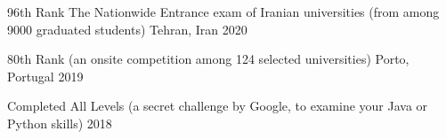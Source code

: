 

\begin{cvhonors}

  \cvhonor
    {96th Rank} %
    {The Nationwide Entrance exam of Iranian universities (from among 9000 graduated students)} %
    {Tehran, Iran} %
    {2020} %

  \cvhonor
    {80th Rank} %
    { (an onsite competition among 124 selected universities)} %
    {Porto, Portugal} %
    {2019} %

  \cvhonor
    {Completed All Levels} %
    { (a secret challenge by Google, to examine your Java or Python skills)} %
    {} %
    {2018} %




\end{cvhonors}
